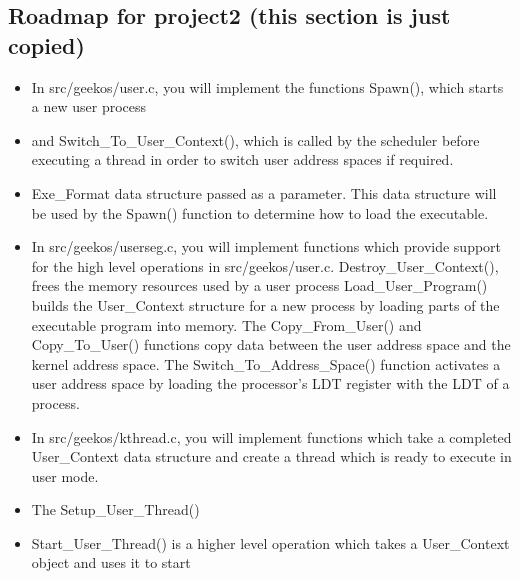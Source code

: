 \subsection{Roadmap for project2 (this section is just copied)}
\begin{itemize}
  \item In src/geekos/user.c, you will implement the functions Spawn(), which starts a new user process
  \item and Switch\_To\_User\_Context(), 
		which is called by the scheduler before executing a thread in order to switch user address spaces if required.
  \item Exe\_Format data structure passed as a parameter. 
  		This data structure will be used by the Spawn() function to determine how to load the executable.
  \item In src/geekos/userseg.c, 
   		you will implement functions which provide support for the high level operations in src/geekos/user.c.
   \subitem Destroy\_User\_Context(), frees the memory resources used by a user process
   \subitem Load\_User\_Program() builds the User\_Context structure for a new process by loading parts of the executable program into memory.
   \subitem The Copy\_From\_User() and Copy\_To\_User() functions copy data between the user address space and the kernel address space. 
   \subitem The Switch\_To\_Address\_Space() function activates a user address space by loading the processor's LDT register with the LDT of a process.
   \item In src/geekos/kthread.c, you will implement functions which take a completed User\_Context data structure and create a thread which is ready to execute in user mode. 
   \item The Setup\_User\_Thread()
   \item Start\_User\_Thread() is a higher level operation which takes a User\_Context object and uses it to start
\end{itemize}
